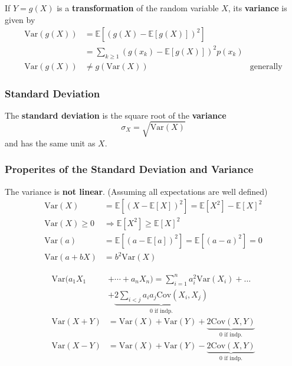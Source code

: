 \newpar{}
If $Y=g(X)$ is a \textbf{transformation} of the random variable $X$, its \textbf{variance} is given by
\noindent\begin{align*}
    \mathrm{Var}(g(X)) & =\mathbb{E}[{(g(X)-\mathbb{E}[g(X)])}^{2}]                                 \\
                       & =\sum_{k\geq1}{(g(x_{k})-\mathbb{E}[g(X)])}^{2}p(x_{k})                    \\
    \mathrm{Var}(g(X)) & \neq g(\mathrm{Var}(X))                                 & \text{generally}
\end{align*}

\subsubsection{Standard Deviation}
The \textbf{standard deviation} is the square root of the \textbf{variance}
\noindent\begin{equation*}
    \sigma_{X}=\sqrt{\mathrm{Var}(X)}
\end{equation*}
and has the same unit as $X$.

\subsubsection{Properites of the Standard Deviation and Variance}
The variance is \textbf{not linear}. (Assuming all expectations are well defined)
\noindent\begin{align*}
    \mathrm{Var}(X)      & =\mathbb{E}[(X-\mathbb{E}[X])^2] = \mathbb{E}[X^2]-{\mathbb{E}[X]}^2 \\
    \mathrm{Var}(X)\geq0 & \Rightarrow\mathbb{E}[X^{2}]\geq{\mathbb{E}[X]}^{2}                  \\
    \mathrm{Var}(a)      & =\mathbb{E}[{(a-\mathbb{E}[a])}^2]=\mathbb{E}[{(a-a)}^2]=0           \\
    \mathrm{Var}(a+bX)   & = b^2\mathrm{Var}(X)
\end{align*}

\noindent\begin{align*}
    \mathrm{Var}(a_1X_1 & +\cdots+a_n X_n)  =\sum_{i=1}^{n}a_{i}^{2}\mathrm{Var}(X_{i})+\ldots                  \\
                        & + \underbrace{2\sum_{i<j}a_{i}a_{j}\mathrm{Cov}(X_{i},X_{j})}_{0\text{ if indp.}}     \\
    \mathrm{Var}(X+Y)   & =\mathrm{Var}(X)+\mathrm{Var}(Y)+ \underbrace{2\mathrm{Cov}(X,Y)}_{0\text{ if indp.}} \\
    \mathrm{Var}(X-Y)   & =\mathrm{Var}(X)+\mathrm{Var}(Y)-\underbrace{2\mathrm{Cov}(X,Y)}_{0\text{ if indp.}}
\end{align*}

